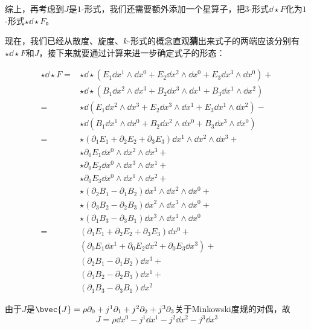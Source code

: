 综上，再考虑到$J$是$1$-形式，我们还需要额外添加一个星算子，把$3$-形式$\dd \star F$化为$1$-形式$\star \dd \star F$。

现在，我们已经从散度、旋度、$k$-形式的概念直观\textbf{猜}出来式子的两端应该分别有$\star \dd \star F$和$J$，接下来就要通过计算来进一步确定式子的形态：


\begin{equation}
    \begin{aligned}
        \star \dd \star F ={}& \star \dd \star (E_1\dd x^1\wedge \dd x^0 + E_2\dd x^2\wedge \dd x^0 + E_3\dd x^3\wedge \dd x^0)+\\
        & \star \dd \star (B_1\dd x^2\wedge \dd x^3+B_2\dd x^3\wedge \dd x^1 + B_3\dd x^1\wedge \dd x^2)\\
        ={}
        & \star \dd (E_1\dd x^2\wedge \dd x^3 + E_2\dd x^3\wedge \dd x^1 + E_3\dd x^1\wedge \dd x^2)-\\
        & \star \dd (B_1\dd x^1\wedge \dd x^0 + B_2\dd x^2\wedge \dd x^0 + B_3\dd x^3\wedge \dd x^0)\\
        ={}
        & \star (\partial_1E_1+\partial_2E_2+\partial_3E_3)\dd x^1\wedge \dd x^2\wedge \dd x^3+\\
        & \star \partial_0E_1\dd x^0\wedge \dd x^2\wedge \dd x^3 +\\
        & \star \partial_0E_2\dd x^0\wedge \dd x^3\wedge \dd x^1 +\\
        & \star \partial_0E_3\dd x^0\wedge \dd x^1\wedge \dd x^2+\\
        & \star (\partial_2B_1-\partial_1B_2)\dd x^1\wedge \dd x^2 \wedge \dd x^0+\\
        & \star (\partial_3B_2-\partial_2B_3)\dd x^2\wedge \dd x^3 \wedge \dd x^0+\\
        & \star (\partial_1B_3-\partial_3B_1)\dd x^3\wedge \dd x^1 \wedge \dd x^0\\
        ={}
        & (\partial_1E_1+\partial_2E_2+\partial_3E_3)\dd x^0+\\
        & (\partial_0 E_1\dd x^1+\partial_0 E_2\dd x^2+\partial_0 E_3\dd x^3)+\\
        & (\partial_2B_1-\partial_1B_2)\dd x^3+\\
        & (\partial_3B_2-\partial_2B_3)\dd x^1+\\
        & (\partial_1B_3-\partial_3B_1)\dd x^2
    \end{aligned}
\end{equation}

由于$J$是$\bvec{J}=\rho\partial_0+j^1\partial_1+j^2\partial_2+j^3\partial_3$关于Minkowski度规的对偶，故
\begin{equation}
J = \rho\dd x^0 - j^1\dd x^1 - j^2\dd x^2 - j^3\dd x^3
\end{equation}

